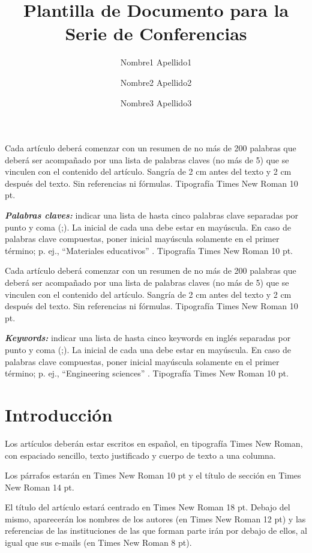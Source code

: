 \documentclass[a4paper,10pt]{article}
\title{Plantilla de Documento para la Serie de Conferencias}
\author[1,*]{Nombre1 Apellido1}
\author[2]{Nombre2 Apellido2}
\author[1]{Nombre3 Apellido3}
\affil[1]{Institución1, Dirección, Ciudad, País}
\affil[2]{Institución1, Dirección, Ciudad, País}
\affil[*]{Autor correspondiente: mail@servidor.com}
\date{}
\renewenvironment{abstract}
 {\small
  \begin{center}
  \bfseries \abstractname\vspace{-.5em}\vspace{0pt}
  \end{center}
  \list{}{%
    \setlength{\leftmargin}{4mm}%
    \setlength{\rightmargin}{\leftmargin}%
  }%
  \item\relax}
 {\endlist}
\providecommand{\keywords}[2]
{
  \hfill \break
  \small	
  \textbf{\textit{#1:}} #2
}
\begin{document}
\maketitle
\thispagestyle{firstpage}

\begin{abstract}
Cada artículo deberá comenzar con un resumen de no más de 200 palabras que deberá ser acompañado por una lista de palabras claves (no más de 5) que se vinculen con el contenido del artículo. Sangría de 2 cm antes del texto y 2 cm después del texto. Sin referencias ni fórmulas. Tipografía Times New Roman 10 pt.     

\keywords{Palabras claves}{indicar una lista de hasta cinco palabras clave separadas por punto y coma (;). La inicial de cada una debe estar en mayúscula. En caso de palabras clave compuestas, poner inicial mayúscula solamente en el primer término; p. ej., ``Materiales educativos'' . Tipografía Times New Roman 10 pt. }
\end{abstract}

\begin{abstract}
Cada artículo deberá comenzar con un resumen de no más de 200 palabras que deberá ser acompañado por una lista de palabras claves (no más de 5) que se vinculen con el contenido del artículo. Sangría de 2 cm antes del texto y 2 cm después del texto. Sin referencias ni fórmulas. Tipografía Times New Roman 10 pt.     

\keywords{Keywords}{indicar una lista de hasta cinco keywords en inglés separadas por punto y coma (;). La inicial de cada una debe estar en mayúscula. En caso de palabras clave compuestas, poner inicial mayúscula solamente en el primer término; p. ej., ``Engineering sciences'' . Tipografía Times New Roman 10 pt.}
\end{abstract} 

\section{Introducción}
Los artículos deberán estar escritos en español, en tipografía Times New Roman, con espaciado sencillo, texto justificado y cuerpo de texto a una columna.  

Los párrafos estarán en Times New Roman 10 pt  y  el título de sección en Times New Roman 14 pt.

El título del artículo estará centrado en Times New Roman 18 pt. Debajo del mismo, aparecerán los nombres de los autores (en Times New Roman 12 pt) y las referencias de las instituciones de las que forman parte irán por debajo de ellos, al igual que sus e-mails (en Times New Roman 8 pt).
\end{document}
